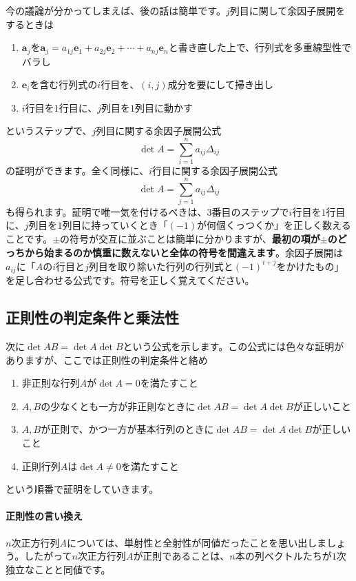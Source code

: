 今の議論が分かってしまえば、後の話は簡単です。$j$列目に関して余因子展開をするときは
\begin{enumerate}
\item $\bm{a}_j$を$\bm{a}_j = a_{1j} \bm{e}_1 + a_{2j} \bm{e}_2 + \cdots + a_{nj} \bm{e}_n$と書き直した上で、行列式を多重線型性でバラし
\item $\bm{e}_i$を含む行列式の$i$行目を、$(i, j)$成分を要にして掃き出し
\item $i$行目を$1$行目に、$j$列目を$1$列目に動かす
\end{enumerate}
というステップで、$j$列目に関する余因子展開公式
\[
\det A = \sum_{i = 1}^n a_{ij}\Delta_{ij}
\]
の証明ができます。全く同様に、$i$行目に関する余因子展開公式
\[
\det A = \sum_{j = 1}^n a_{ij}\Delta_{ij}
\]
も得られます。証明で唯一気を付けるべきは、$3$番目のステップで$i$行目を$1$行目に、$j$列目を$1$列目に持っていくとき「$(-1)$が何個くっつくか」を正しく数えることです。$\pm$の符号が交互に並ぶことは簡単に分かりますが、\textbf{最初の項が$\pm$のどっちから始まるのか慎重に数えないと全体の符号を間違えます}。余因子展開は$a_{ij}$に「$A$の$i$行目と$j$列目を取り除いた行列の行列式と$(-1)^{i + j}$をかけたもの」を足し合わせる公式です。符号を正しく覚えてください。

\subsection{正則性の判定条件と乗法性}

次に$\det AB = \det A \det B$という公式を示します。この公式には色々な証明がありますが、ここでは正則性の判定条件と絡め
\begin{enumerate}
\item 非正則な行列$A$が$\det A = 0$を満たすこと
\item $A, B$の少なくとも一方が非正則なときに$\det AB = \det A \det B$が正しいこと
\item $A, B$が正則で、かつ一方が基本行列のときに$\det AB = \det A \det B$が正しいこと
\item 正則行列$A$は$\det A \neq 0$を満たすこと
\end{enumerate}
という順番で証明をしていきます。

\paragraph{正則性の言い換え}

$n$次正方行列$A$については、単射性と全射性が同値だったことを思い出しましょう。したがって$n$次正方行列$A$が正則であることは、$n$本の列ベクトルたちが$1$次独立なことと同値です。

